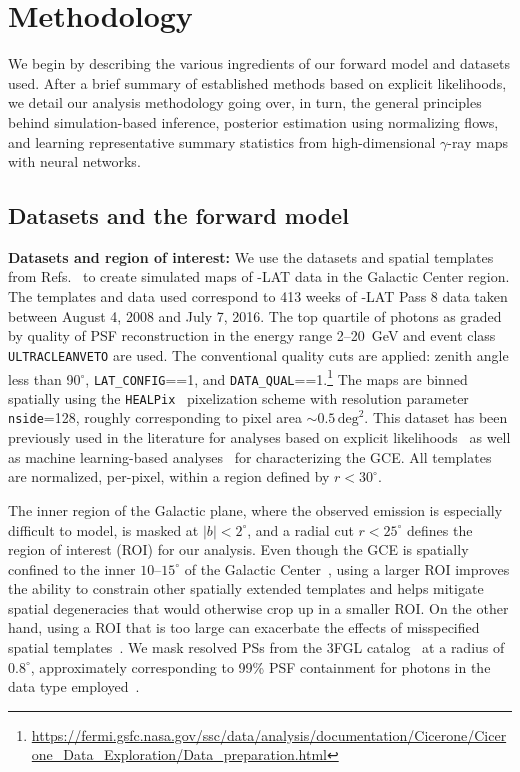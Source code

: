 \documentclass[prd,aps,10pt,nofootinbib,twocolumn,superscriptaddress,preprintnumbers,balancelastpage,longbibliography,floatfix]{revtex4-2}
\begin{document}
\section{Methodology}
\label{sec:analysis}

We begin by describing the various ingredients of our forward model and datasets used. After a brief summary of established methods based on explicit likelihoods, we detail our analysis methodology going over, in turn, the general principles behind simulation-based inference, posterior estimation using normalizing flows, and learning representative summary statistics from high-dimensional $\gamma$-ray maps with neural networks.

\subsection{Datasets and the forward model}
\label{sec:datasets}

\noindent
\textbf{Datasets and region of interest:} We use the datasets and spatial templates from Refs.~\cite{rodd_nicholas_safdi_siddharth_2016,Mishra-Sharma:2016gis} to create simulated maps of \Fermi-LAT data in the Galactic Center region. The templates and data used correspond to 413 weeks of \Fermi-LAT Pass 8 data taken between August 4, 2008 and July 7, 2016. The top quartile of photons as graded by quality of PSF reconstruction in the energy range 2--20~GeV and event class \texttt{ULTRACLEANVETO} are used. The conventional quality cuts are applied: zenith angle less than 90$^\circ$, \texttt{LAT\_CONFIG}==1, and \texttt{DATA\_QUAL}==1.\footnote{\url{https://fermi.gsfc.nasa.gov/ssc/data/analysis/documentation/Cicerone/Cicerone_Data_Exploration/Data_preparation.html}} The maps are binned spatially using the \texttt{HEALPix}~\cite{Gorski:2004by} pixelization scheme with resolution parameter \texttt{nside}=128, roughly corresponding to pixel area $\sim 0.5\,\mathrm{deg}^2$. This dataset has been previously used in the literature for analyses based on explicit likelihoods~\cite{Buschmann:2020adf,Chang:2019ars,Leane:2019xiy} as well as machine learning-based analyses~\cite{List:2020mzd} for characterizing the GCE. All templates are normalized, per-pixel, within a region defined by $r < 30^\circ$.

The inner region of the Galactic plane, where the observed emission is especially difficult to model, is masked at $|b| < 2^\circ$, and a radial cut $r < 25^\circ$ defines the region of interest (ROI) for our analysis. Even though the GCE is spatially confined to the inner $10\mbox{--}15^\circ$ of the Galactic Center~\cite{Daylan:2014rsa,Calore:2014xka}, using a larger ROI improves the ability to constrain other spatially extended templates and helps mitigate spatial degeneracies that would otherwise crop up in a smaller ROI. On the other hand, using a ROI that is too large can exacerbate the effects of misspecified spatial templates~\cite{Chang:2018bpt}. We mask resolved PSs from the 3FGL catalog~\cite{Fermi-LAT:2015bhf} at a radius of $0.8^\circ$, approximately corresponding to 99\% PSF containment for photons in the data type employed~\cite{Fermi-LAT:2015bhf}. \\
\end{document}
